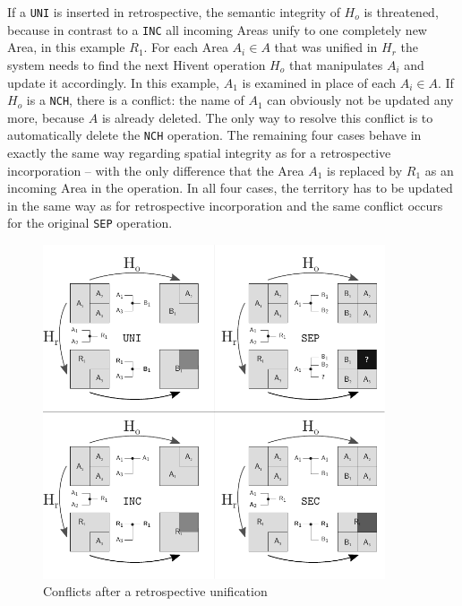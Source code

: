 If a \texttt{UNI} is inserted in retrospective, the semantic integrity of $H_o$ is threatened, because in contrast to a \texttt{INC} all incoming Areas unify to one completely new Area, in this example $R_1$. For each Area $A_i \in A$ that was unified in $H_r$ the system needs to find the next Hivent operation $H_o$ that manipulates $A_i$ and update it accordingly. In this example, $A_1$ is examined in place of each $A_i \in A$. If $H_o$ is a \texttt{NCH}, there is a conflict: the name of $A_1$ can obviously not be updated any more, because $A$ is already deleted. The only way to resolve this conflict is to automatically delete the \texttt{NCH} operation. The remaining four cases behave in exactly the same way regarding spatial integrity as for a retrospective incorporation -- with the only difference that the Area $A_1$ is replaced by $R_1$ as an incoming Area in the operation. In all four cases, the territory has to be updated in the same way as for retrospective incorporation and the same conflict occurs for the original \texttt{SEP} operation.

\begin{figure}[ht]
\vspace{1em}
  \centering
  \includegraphics[width=0.9\textwidth]{graphics/development/editing_hivent_data/retrospective_updates/UNI}
  \caption{Conflicts after a retrospective unification}
  \label{fig:update_conflict_UNI}
\end{figure}

